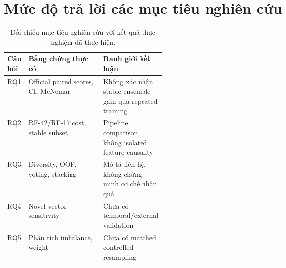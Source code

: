 \section{Mức độ trả lời các mục tiêu nghiên cứu}
\begin{table}[htbp]\centering
\small
\caption{Đối chiếu mục tiêu nghiên cứu với kết quả thực nghiệm đã thực hiện.}
\label{tab:rq-evidence}
\begin{tabularx}{\linewidth}{p{0.11\linewidth}X p{0.26\linewidth}}\toprule
Câu hỏi & Bằng chứng thực có & Ranh giới kết luận\\\midrule
RQ1 & Official paired scores, CI, McNemar & Không xác nhận stable ensemble gain qua repeated training\\
RQ2 & RF-42/RF-17 cost, stable subset & Pipeline comparison, không isolated feature causality\\
RQ3 & Diversity, OOF, voting, stacking & Mô tả liên hệ, không chứng minh cơ chế nhân quả\\
RQ4 & Novel-vector sensitivity & Chưa có temporal/external validation\\
RQ5 & Phân tích imbalance, weight & Chưa có matched controlled resampling\\\bottomrule
\end{tabularx}
\end{table}
